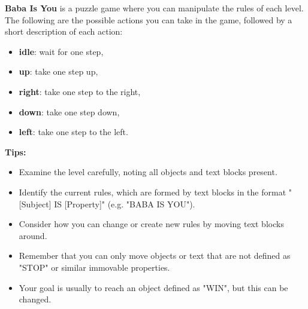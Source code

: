 
\begin{GreenBox}
	\textbf{Baba Is You} is a puzzle game where you can manipulate the rules of
	each level. The following are the possible actions you can take in the game,
	followed by a short description of each action:

	\begin{itemize}
		\item \textbf{idle}: wait for one step,

		\item \textbf{up}: take one step up,

		\item \textbf{right}: take one step to the right,

		\item \textbf{down}: take one step down,

		\item \textbf{left}: take one step to the left.
	\end{itemize}

	\textbf{Tips:}
	\begin{itemize}
		\item Examine the level carefully, noting all objects and text blocks
			present.

		\item Identify the current rules, which are formed by text blocks in the
			format "[Subject] IS [Property]" (e.g. "BABA IS YOU").

		\item Consider how you can change or create new rules by moving text blocks around.

		\item Remember that you can only move objects or text that are not defined as
			"STOP" or similar immovable properties.

		\item Your goal is usually to reach an object defined as "WIN", but this can
			be changed.


\end{itemize}
\end{GreenBox}
